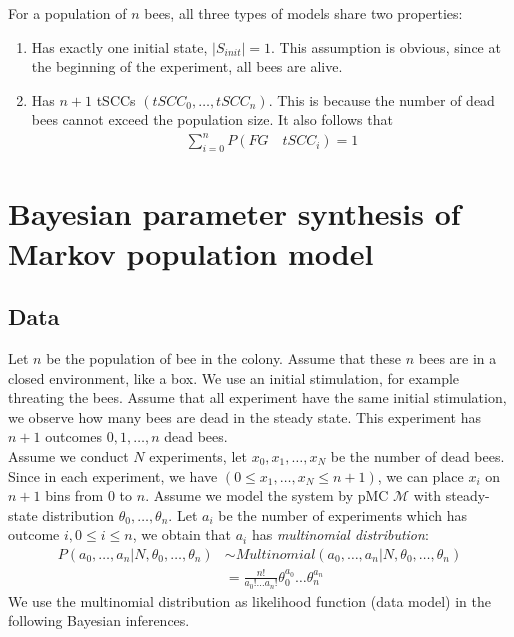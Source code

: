 \documentclass[12pt]{article}
\theoremstyle{definition}
\begin{document}
For a population of $n$ bees, all three types of models share two properties:
\begin{enumerate}
\item Has exactly one initial state, $|S_{init}| = 1$. This assumption is
  obvious, since at the beginning of the experiment, all bees are alive.
\item Has $n+1$ tSCCs $(tSCC_0,\ldots,tSCC_n)$. This is because the number of
  dead bees cannot exceed the population size. It also follows that
  \begin{align*}
    \sum_{i=0}^n P(FG\quad tSCC_i) = 1
  \end{align*}
\end{enumerate}


\section{Bayesian parameter synthesis of Markov population model}
\subsection{Data}

Let $n$ be the population of bee in the colony. Assume that these $n$ bees are
in a closed environment, like a box. We use an initial stimulation, for example
threating the bees. Assume that all experiment have the same initial
stimulation, we observe how many bees are dead in the steady state. This
experiment has $n+1$ outcomes $0,1,\ldots,n$ dead bees.\\
Assume we conduct $N$ experiments, let $x_0,x_1,\ldots,x_N$ be the number of
dead bees. Since in each experiment, we have $(0 \leq x_1,\ldots,x_N \leq n+1)$,
we can place $x_i$ on $n+1$ bins from $0$ to $n$. Assume we model the system by
pMC $\mathcal{M}$ with steady-state distribution $\theta_0,\ldots,\theta_n$. Let
$a_i$ be the number of experiments which has outcome $i, 0 \leq i \leq n$, we
obtain that $a_i$ has \textit{multinomial distribution}:
\begin{align*}
  P(a_0,\ldots,a_n | N, \theta_0,\ldots,\theta_n) &\sim Multinomial(a_0,\ldots,a_n | N, \theta_0,\ldots,\theta_n) \\
                                                  &= \frac{n!}{a_0!\ldots a_n!} \theta_0^{a_0}\ldots \theta_n^{a_n}
\end{align*}
We use the multinomial distribution as likelihood function (data model) in the
following Bayesian inferences.
\end{document}
